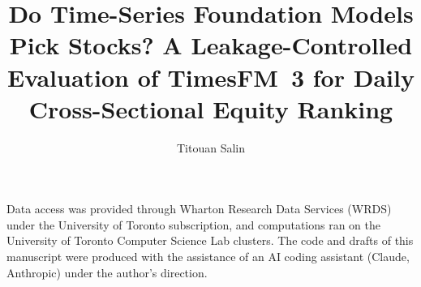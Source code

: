 \documentclass[sigconf]{acmart}
\begin{document}
\title[Do Time-Series Foundation Models Pick Stocks?]{Do Time-Series Foundation Models Pick Stocks? A Leakage-Controlled Evaluation of TimesFM~3 for Daily Cross-Sectional Equity Ranking}

\author{Titouan Salin}





\maketitle
\pagestyle{plain}









\begin{acks}
Data access was provided through Wharton Research Data Services (WRDS) under the University of Toronto subscription, and computations ran on the University of Toronto Computer Science Lab clusters.
The code and drafts of this manuscript were produced with the assistance of an AI coding assistant (Claude, Anthropic) under the author's direction.
\end{acks}



\end{document}
